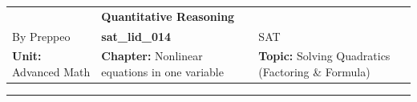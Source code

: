 \documentclass[11pt,paper=a4,answers]{exam}
\begin{document}
\begin{center}
    \centering
    \renewcommand{\arraystretch}{1.5}
    \begin{tabularx}{\textwidth}{YYY}
    & \normalsize\bf{{\Large{{Quantitative Reasoning}}}} & \\
    By Preppeo & \normalsize\bf{{sat\_lid\_014}} & SAT\\
    \normalsize{{\textbf{{Unit:}} Advanced Math}} & \normalsize{{\textbf{{Chapter:}} Nonlinear equations in one variable}} & \normalsize{{\textbf{{Topic:}} Solving Quadratics (Factoring \& Formula)}} \\
    \end{tabularx}
\end{center}
\par\noindent\rule{\textwidth}{1pt}
\end{document}
